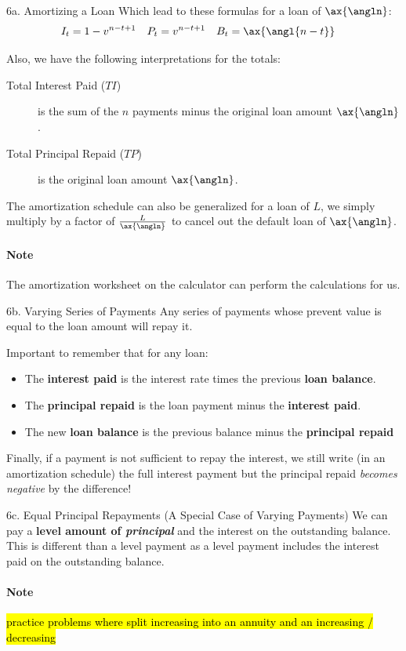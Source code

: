 \begin{CHPT_SUMM_AUTO}[label = {L.-6a}]{6a. Amortizing a Loan}
Which lead to these formulas for a loan of $\ax{\angln}$:
\begin{align*}
	I_{t}	&=	1 - v^{n - t + 1}	&
	P_{t}	&=	v^{n - t + 1}	&
	B_{t}	&=	\ax{\angl{n - t}}
\end{align*}

Also, we have the following interpretations for the totals:
\begin{description}
	\item[Total Interest Paid ($TI$)]	is the sum of the $n$ payments minus the original loan amount $\ax{\angln}$.
	\item[Total Principal Repaid ($TP$)]	is the original loan amount $\ax{\angln}$.
\end{description}

The amortization schedule can also be generalized for a loan of $L$, we simply multiply by a factor of $\frac{L}{\ax{\angln}}$ to cancel out the default loan of $\ax{\angln}$.\\

\paragraph*{Note}	The amortization worksheet on the calculator can perform the calculations for us.
\end{CHPT_SUMM_AUTO}

\begin{CHPT_SUMM_AUTO}[label = {L.-6b}]{6b. Varying Series of Payments}
Any series of payments whose prevent value is equal to the loan amount will repay it.

Important to remember that for any loan:
\begin{itemize}
	\item	The \textbf{interest paid} is the interest rate times the previous \textbf{loan balance}.
	\item	The \textbf{principal repaid} is the loan payment minus the \textbf{interest paid}.
	\item	The new \textbf{loan balance} is the previous balance minus the \textbf{principal repaid}
\end{itemize}

Finally, if a payment is not sufficient to repay the interest, we still write (in an amortization schedule) the full interest payment but the principal repaid \textit{becomes negative} by the difference!
\end{CHPT_SUMM_AUTO}

\begin{CHPT_SUMM_AUTO}[label = {L.-6c}]{6c. Equal Principal Repayments (A Special Case of Varying Payments)}
We can pay a \textbf{level amount of \textit{principal}} and the interest on the outstanding balance. This is different than a level payment as a level payment includes the interest paid on the outstanding balance.

\paragraph*{Note}	\hl{practice problems where split increasing into an annuity and an increasing / decreasing}
\end{CHPT_SUMM_AUTO}

